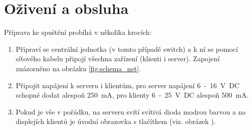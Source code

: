 \section{Oživení a obsluha}
\label{sec:ovladani}
Příprava ke spuštění probíhá v několika krocích:
\begin{enumerate}
  \item Připraví se centrální jednotka (v tomto případě switch) a k ní se pomocí síťového kabelu připojí všechna zařízení (klienti i server). Zapojení znázorněno na obrázku \ref{fig:schema_net}.

  \item Připojit napájení k serveru i klientům, pro server napájení 6~-~16~V~DC schopné dodat alespoň 250~mA, pro klienty 6~-~25~V~DC alespoň 500~mA.

  \item Pokud je vše v pořádku, na serveru svítí svítivá dioda modrou barvou a na displejích klientů je úvodní obrazovka s tlačítkem  (viz. obrázek \label{fig:faze1}).
\end{enumerate}

